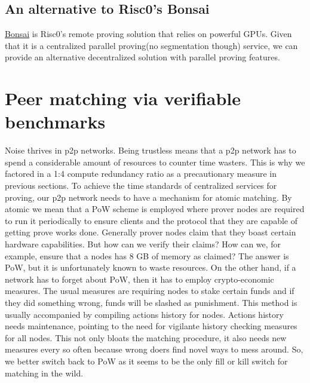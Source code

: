 \documentclass[a4paper, 10pt]{article}
\begin{document}
\subsection{An alternative to Risc0's Bonsai}
\href{https://dev.risczero.com/api/generating-proofs/remote-proving}{Bonsai} is Risc0's remote proving solution that relies on powerful GPUs. Given that it is a centralized parallel proving(no segmentation though) service, we can provide an  alternative decentralized solution with parallel proving features.

\section{Peer matching via verifiable benchmarks}
Noise thrives in p2p networks. Being trustless means that a p2p network has to spend a considerable amount of resources to counter time wasters. This is why we factored in a 1:4 compute redundancy ratio as a precautionary measure in previous sections. To achieve the time standards of centralized services for proving, our p2p network needs to have a mechanism for atomic matching. By atomic we mean that a PoW scheme is employed where prover nodes are required to run it periodically to ensure clients and the protocol that they are capable of getting prove works done. Generally prover nodes claim that they boast certain hardware capabilities. But how can we verify their claims? How can we, for example, ensure that a nodes has 8 GB of memory as claimed? The answer is PoW, but it is unfortunately known to waste resources. On the other hand, if a network has to forget about PoW, then it has to employ crypto-economic measures. The usual measures are requiring nodes to stake certain funds and if they did something wrong, funds will be slashed as punishment. This method is usually accompanied by compiling actions history for nodes. Actions history needs maintenance, pointing to the need for vigilante history checking measures for all nodes. This not only bloats the matching procedure, it also needs new measures every so often because wrong doers find novel ways to mess around. So, we better switch back to PoW as it seems to be the only fill or kill switch for matching in the wild.
\par
\end{document}
